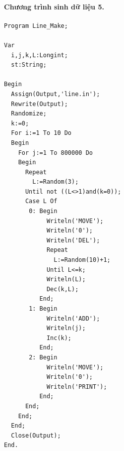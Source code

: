 \documentclass[11pt]{article}
\begin{document}
\paragraph{Chương trình sinh dữ liệu 5.}
{\small
\begin{verbatim}
Program Line_Make;

Var
  i,j,k,L:Longint;
  st:String;

Begin
  Assign(Output,'line.in');
  Rewrite(Output);
  Randomize;
  k:=0;
  For i:=1 To 10 Do
  Begin
    For j:=1 To 800000 Do
    Begin
      Repeat
        L:=Random(3);
      Until not ((L<>1)and(k=0));
      Case L Of
       0: Begin
            Writeln('MOVE');
            Writeln('0');
            Writeln('DEL');
            Repeat
              L:=Random(10)+1;
            Until L<=k;
            Writeln(L);
            Dec(k,L);
          End;
       1: Begin
            Writeln('ADD');
            Writeln(j);
            Inc(k);
          End;
       2: Begin
            Writeln('MOVE');
            Writeln('0');
            Writeln('PRINT');
          End;
      End;
    End;
  End;
  Close(Output);
End.
\end{verbatim}
}
\end{document}
